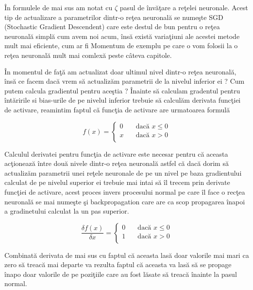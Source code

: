 \^{I}n formulele de mai sus am notat cu $\zeta$ pasul de \^{i}nv\u{a}\c{t}are a re\c{t}elei neuronale. Acest tip de actualizare a parametrilor dintr-o re\c{t}ea neuronal\u{a} se nume\c{s}te SGD (Stochastic Gradient Descendent) care este destul de bun pentru o re\c{t}ea neuronal\u{a} simpl\u{a} cum avem noi acum, \^{i}ns\u{a} exist\u{a} varia\c{t}iuni ale acestei metode mult mai eficiente, cum ar fi Momentum de exemplu pe care o vom folosii la o re\c{t}ea neuronal\u{a} mult mai comlex\u{a} peste c\^{a}teva capitole.

\par

\^{I}n momentul de fa\c{t}\u{a} am actualizat doar ultimul nivel dintr-o re\c{t}ea neuronal\u{a}, \^{i}ns\u{a} ce facem dac\u{a} vrem s\u{a} actualiz\u{a}m parametrii de la nivelul inferior ei ? Cum putem calcula gradientul pentru ace\c{s}tia ? \^{I}nainte s\u{a} calculam gradentul pentru \^{i}nt\u{a}ririle si bias-urile de pe nivelul inferior trebuie s\u{a} calcul\u{a}m derivata func\c{t}iei de activare, reamintim faptul c\u{a} func\c{t}ia de activare are urmatoarea formul\u{a} 

\[ f(x) =
  \begin{cases}
    0       & \quad \text{dac\u{a} } x \leq 0\\
    x  & \quad \text{dac\u{a} } x > 0\\
  \end{cases}
\]

Calculul derivatei pentru func\c{t}ia de activare este necesar pentru c\u{a} aceasta ac\c{t}ioneaz\u{a} \^{i}ntre dou\u{a} nivele dintr-o re\c{t}ea neuronal\u{a} astfel c\u{a} dac\u{a} dorim s\u{a} actualiz\u{a}m parametrii unei re\c{t}ele neuronale de pe un nivel pe baza gradientului calculat de pe nivelul superior ei trebuie mai intai s\u{a} \^{i}l trecem prin derivate func\c{t}iei de activare, acest proces invers procesului normal pe care \^{i}l face o rec\c{t}ea neuronal\u{a} se mai nume\c{s}te \c{s}i backpropagation care are ca scop propagarea \^{i}napoi a gradinetului calculat la un pas superior.

\[ \frac{\delta f(x)}{\delta x}  =
  \begin{cases}
    0       & \quad \text{dac\u{a} } x \leq 0\\
    1  & \quad \text{dac\u{a} } x > 0\\
  \end{cases}
\]

Combinat\u{a} derivata de mai sus cu faptul c\u{a} aceasta las\u{a} doar valorile mai mari ca zero s\u{a} treac\u{a} mai departe va rezulta faptul c\u{a} aceasta va las\u{a} s\u{a} se propage \^{i}napo doar valorile de pe pozi\c{t}iile care au fost l\u{a}sate s\u{a} treac\u{a} \^{i}nainte la pasul normal.

